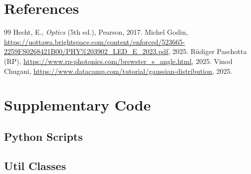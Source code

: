 \documentclass[12pt,a4paper]{article}
\begin{document}
\section{References}
\begin{thebibliography}{99}
     Hecht, E., \textit{Optics} (5th ed.), Pearson, 2017.
     Michel Godin, \url{https://uottawa.brightspace.com/content/enforced/523665-2259FS0268421B00/PHY%203902_LED_E_2023.pdf}, 2025.
     R\"udiger Paschotta (RP), \url{https://www.rp-photonics.com/brewster_s_angle.html}, 2025.
     Vinod Chugani, \url{https://www.datacamp.com/tutorial/gaussian-distribution}, 2025.
\end{thebibliography}


\appendix
\section{Supplementary Code}
\subsection*{Python Scripts}

    
    
    

\subsection*{Util Classes}

    
    
    
    
    
\end{document}
